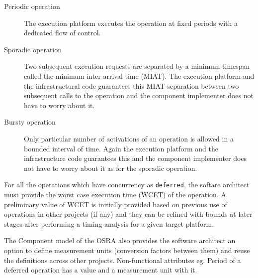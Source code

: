 \begin{description}
\begin{description}
\item [Periodic operation] The execution platform executes the operation at fixed periods with a dedicated flow of control.
\item [Sporadic operation] Two subsequent execution requests are separated by a minimum timespan called the minimum inter-arrival time (MIAT). The execution platform and the infrastructural code  guarantees this MIAT separation between two subsequent calls to the operation and the component implementer does not have to worry about it.
\item [Bursty operation] Only particular number of activations of an operation is allowed in a bounded interval of time. Again the execution platform and the infrastructure code guarantees this and the component implementer does not have to worry about it as for the sporadic operation.
\end{description}

For all the operations which have concurrency as \texttt{deferred}, the softare architect must provide the worst case execution time (WCET) of the operation. A preliminary value of WCET is initially provided based on previous use of operations in other projects (if any) and they can be refined with bounds at later stages after performing a timing analysis for a given target platform.

The Component model of the OSRA also provides the software architect an option to define measurement units (conversion factors between them) and reuse the definitions across other projects. Non-functional attributes eg. Period of a deferred operation has a value and a measurement unit with it.


\end{description}
